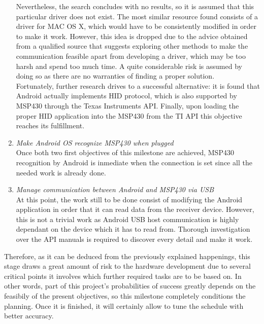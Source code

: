 \begin{enumerate}
				Nevertheless, the search concludes with no results, so it is assumed that this particular driver
				does not exist. The most similar resource found consists of a driver for MAC OS X, which would
				have to be consistently modified in order to make it work. However, this idea is dropped due to
				the advice obtained from a qualified source that suggests exploring other methods to make the
				communication feasible apart from developing a driver, which may be too harsh and spend too much
				time. A quite considerable risk is assumed by doing so as there are no warranties of finding a
				proper solution.\\
				
				Fortunately, further research drives to a successful alternative: it is found that Android
				actually implements HID protocol, which is also supported by MSP430 through the Texas Instruments
				API. Finally, upon loading the proper HID application into the MSP430 from the TI API this
				objective reaches its fulfillment.\\

			\item \emph{Make Android OS recognize MSP430 when plugged}\\
				Once both two first objectives of this milestone are achieved, MSP430 recognition by Android is
				inmediate when the connection is set since all the needed work is already done.\\

			\item \emph{Manage communication between Android and MSP430 via USB}\\
				At this point, the work still to be done consist of modifying the Android application in order
				that it can read data from the receiver device. However, this is not a trivial work as Android
				USB host communication is highly dependant on the device which it has to read from. Thorough
				investigation over the API manuals is required to discover every detail and make it work.\\

		\end{enumerate}

		Therefore, as it can be deduced from the previously explained happenings, this stage draws a great amount 
		of risk to the hardware development due to several critical points it involves which further required
		tasks are to be based on. In other words, part of this project's probabilities of success greatly depends
		on the feasibily of the present objectives, so this milestone completely conditions the planning. Once 
		it is finished, it will certainly allow to tune the schedule with better accuracy.\\

